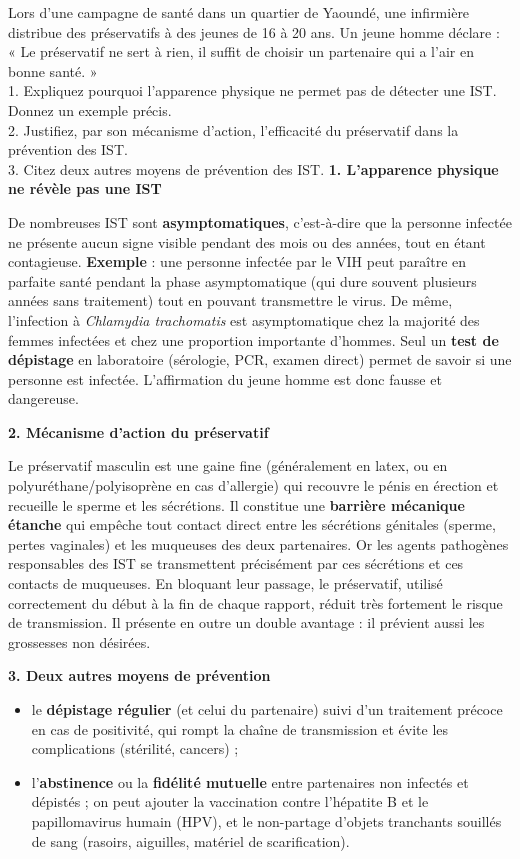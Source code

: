 \documentclass[11pt]{article}
\begin{document}
\begin{exoresolu}
Lors d'une campagne de santé dans un quartier de Yaoundé, une infirmière distribue des préservatifs à des jeunes de 16 à 20 ans. Un jeune homme déclare : « Le préservatif ne sert à rien, il suffit de choisir un partenaire qui a l'air en bonne santé. »\\
1. Expliquez pourquoi l'apparence physique ne permet pas de détecter une IST. Donnez un exemple précis.\\
2. Justifiez, par son mécanisme d'action, l'efficacité du préservatif dans la prévention des IST.\\
3. Citez deux autres moyens de prévention des IST.
\tcblower
\textbf{1. L'apparence physique ne révèle pas une IST}

De nombreuses IST sont \textbf{asymptomatiques}, c'est-à-dire que la personne infectée ne présente aucun signe visible pendant des mois ou des années, tout en étant contagieuse. \textbf{Exemple} : une personne infectée par le VIH peut paraître en parfaite santé pendant la phase asymptomatique (qui dure souvent plusieurs années sans traitement) tout en pouvant transmettre le virus. De même, l'infection à \emph{Chlamydia trachomatis} est asymptomatique chez la majorité des femmes infectées et chez une proportion importante d'hommes. Seul un \textbf{test de dépistage} en laboratoire (sérologie, PCR, examen direct) permet de savoir si une personne est infectée. L'affirmation du jeune homme est donc fausse et dangereuse.

\textbf{2. Mécanisme d'action du préservatif}

Le préservatif masculin est une gaine fine (généralement en latex, ou en polyuréthane/polyisoprène en cas d'allergie) qui recouvre le pénis en érection et recueille le sperme et les sécrétions. Il constitue une \textbf{barrière mécanique étanche} qui empêche tout contact direct entre les sécrétions génitales (sperme, pertes vaginales) et les muqueuses des deux partenaires. Or les agents pathogènes responsables des IST se transmettent précisément par ces sécrétions et ces contacts de muqueuses. En bloquant leur passage, le préservatif, utilisé correctement du début à la fin de chaque rapport, réduit très fortement le risque de transmission. Il présente en outre un double avantage : il prévient aussi les grossesses non désirées.

\textbf{3. Deux autres moyens de prévention}

\begin{itemize}
\item le \textbf{dépistage régulier} (et celui du partenaire) suivi d'un traitement précoce en cas de positivité, qui rompt la chaîne de transmission et évite les complications (stérilité, cancers) ;
\item l'\textbf{abstinence} ou la \textbf{fidélité mutuelle} entre partenaires non infectés et dépistés ; on peut ajouter la vaccination contre l'hépatite B et le papillomavirus humain (HPV), et le non-partage d'objets tranchants souillés de sang (rasoirs, aiguilles, matériel de scarification).
\end{itemize}


\end{exoresolu}
\end{document}
